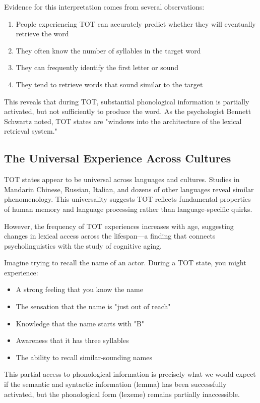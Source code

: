 \documentclass[12pt,a4paper]{article}
\begin{document}
Evidence for this interpretation comes from several observations:

\begin{enumerate}
\item People experiencing TOT can accurately predict whether they will eventually retrieve the word
\item They often know the number of syllables in the target word
\item They can frequently identify the first letter or sound
\item They tend to retrieve words that sound similar to the target
\end{enumerate}

This reveals that during TOT, substantial phonological information is partially activated, but not sufficiently to produce the word. As the psychologist Bennett Schwartz noted, TOT states are "windows into the architecture of the lexical retrieval system."

\subsection{The Universal Experience Across Cultures}

TOT states appear to be universal across languages and cultures. Studies in Mandarin Chinese, Russian, Italian, and dozens of other languages reveal similar phenomenology. This universality suggests TOT reflects fundamental properties of human memory and language processing rather than language-specific quirks.

However, the frequency of TOT experiences increases with age, suggesting changes in lexical access across the lifespan—a finding that connects psycholinguistics with the study of cognitive aging.

\begin{tcolorbox}[enhanced, colback=purple!5, colframe=purple!75!black, title=Phenomenology of TOT States]
Imagine trying to recall the name of an actor. During a TOT state, you might experience:

\begin{itemize}
\item A strong feeling that you know the name
\item The sensation that the name is "just out of reach"
\item Knowledge that the name starts with "B"
\item Awareness that it has three syllables
\item The ability to recall similar-sounding names
\end{itemize}

This partial access to phonological information is precisely what we would expect if the semantic and syntactic information (lemma) has been successfully activated, but the phonological form (lexeme) remains partially inaccessible.
\end{tcolorbox}
\end{document}
